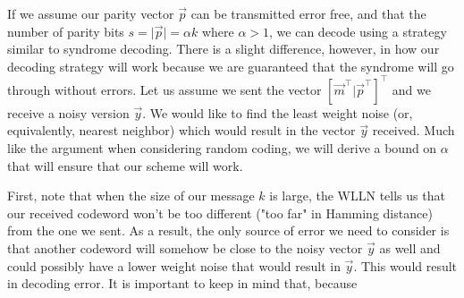 \documentclass[11pt]{article}
\begin{document}
\begin{enumerate}
\begin{enumerate}
        If we assume our parity vector $\vec{p}$ can be transmitted error free, and that the number of parity bits $s = \vert \vec{p} \vert = \alpha k$ where $\alpha > 1$, we can decode using a strategy similar to syndrome decoding.  There is a slight difference, however, in how our decoding strategy will work because we are guaranteed that the syndrome will go through without errors. Let us assume we sent the vector $[ \vec{m}^\top \vert \vec{p}^\top]^\top$ and we receive a noisy version $\vec{y}$. We would like to find the least weight noise (or, equivalently, nearest neighbor) which would result in the vector $\vec{y}$ received. Much like the argument when considering random coding, we will derive a bound on $\alpha$ that will ensure that our scheme will work.\newline
        
        First, note that when the size of our message $k$ is large, the WLLN tells us that our received codeword won't be too different ("too far" in Hamming distance) from the one we sent. As a result, the only source of error we need to consider is that another codeword will somehow be close to the noisy vector $\vec{y}$ as well and could possibly have a lower weight noise that would result in $\vec{y}$. This would result in decoding error. It is important to keep in mind that, because


\end{enumerate}
\end{enumerate}
\end{document}
